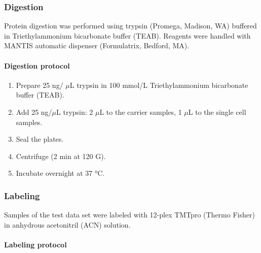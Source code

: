 \documentclass[
  11pt,
]{article}
\begin{document}
\hypertarget{digestion}{%
\subsubsection{Digestion}\label{digestion}}

Protein digestion was performed using trypsin (Promega, Madison, WA) buffered in Triethylammonium bicarbonate buffer (TEAB). Reagents were handled with MANTIS automatic dispenser (Formulatrix, Bedford, MA).

\hypertarget{digestion-protocol}{%
\paragraph{Digestion protocol}\label{digestion-protocol}}

\begin{enumerate}
\item Prepare 25 ng/ $\mu$L trypsin in 100 mmol/L Triethylammonium bicarbonate buffer (TEAB).
\item Add 25 ng/$\mu$L trypsin: 2 $\mu$L to the carrier samples, 1 $\mu$L to the single cell samples.
\item Seal the plates.
\item Centrifuge (2 min at 120 G).
\item Incubate overnight at 37 °C.
\end{enumerate}

\hypertarget{labeling}{%
\subsubsection{Labeling}\label{labeling}}

Samples of the test data set were labeled with 12-plex TMTpro (Thermo Fisher) in anhydrous acetonitril (ACN) solution.

\hypertarget{labeling-protocol}{%
\paragraph{Labeling protocol}\label{labeling-protocol}}
\end{document}
